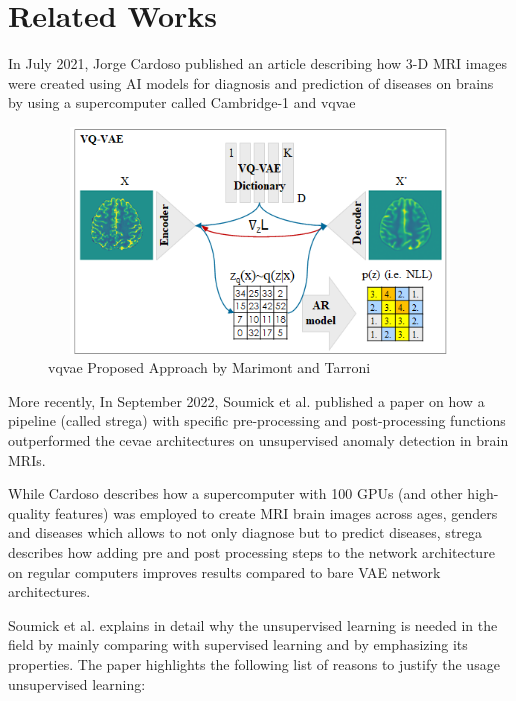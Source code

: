 \section{Related Works}

In July 2021, Jorge Cardoso published an article \cite{jcardoso} describing how 3-D MRI images were created using AI models for diagnosis and prediction of diseases on brains by using a supercomputer called Cambridge-1 and \Acrfull{vqvae}

\begin{figure}[ht]
    \hspace*{-0.8in}
    \centering
    \includegraphics[width = 16cm, height = 6cm]{images/vqvae.png}
    \caption[]{\Acrshort{vqvae} Proposed Approach by Marimont and Tarroni}
    \label{fig:vqvae}
\end{figure}

More recently, In September 2022, Soumick et al. \cite{soumick} published a paper on how a pipeline (called \Acrshort{strega}) with specific pre-processing and post-processing functions outperformed the \Acrfull{cevae} architectures on unsupervised anomaly detection in brain MRIs.

While Cardoso describes how a supercomputer with 100 GPUs (and other high-quality features) was employed to create MRI brain images across ages, genders and diseases which allows to not only diagnose but to predict diseases, \Acrshort{strega} describes how adding pre and post processing steps to the network architecture on regular computers improves results compared to bare VAE network architectures.

Soumick et al. \cite{soumick} explains in detail why the unsupervised learning is needed in the field by mainly comparing with supervised learning and by emphasizing its properties. The paper highlights the following list of reasons to justify the usage unsupervised learning:

